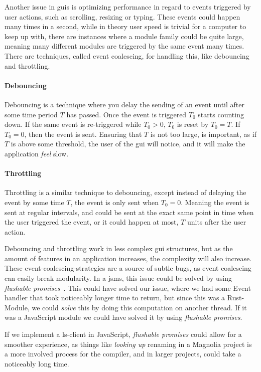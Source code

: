 Another issue in \gls*{gui}s is optimizing performance in regard to events
triggered by user actions, such as scrolling, resizing or typing. These events
could happen many times in a second, while in theory user speed is trivial for a
computer to keep up with, there are instances where a module family could be
quite large, meaning many different modules are triggered by the same event many
times. There are techniques, called event coalescing, for handling this, like
debouncing and throttling.

\paragraph{Debouncing} Debouncing is a technique where you delay the sending of
an event until after some time period $T$ has passed. Once the event is triggered
$T_0$ starts counting down. If the same event is re-triggered while $T_0 > 0$,
$T_0$ is reset by $T_0 = T$. If $T_0 = 0$, then the event is sent. Ensuring that
$T$ is not too large, is important, as if $T$ is above some threshold, the user
of the \gls*{gui} will notice, and it will make the application \textit{feel}
slow.

\paragraph{Throttling} Throttling is a similar technique to debouncing, except
instead of delaying the event by some time $T$, the event is only sent when
$T_0 = 0$. Meaning the event is sent at regular intervals, and could be sent at
the exact same point in time when the user triggered the event, or it could
happen at most, $T$ units after the user action.

Debouncing and throttling work in less complex \gls*{gui} structures, but as the
amount of features in an application increases, the complexity will also
increase. These event-coalescing-strategies are a source of subtle bugs, as
event coalescing can easily break modularity. In a \gls*{jsms}, this issue could
be solved by using \textit{flushable promises}~\cite{flush}. This could have
solved our issue, where we had some Event handler that took noticeably longer
time to return, but since this was a Rust-Module, we could \textit{solve} this
by doing this computation on another thread. If it was a JavaScript module we
could have solved it by using \textit{flushable promises}.

If we implement a \gls*{ls}-client in JavaScript, \textit{flushable promises}
could allow for a smoother experience, as things like \textit{looking up}
renaming in a Magnolia project is a more involved process for the compiler,
and in larger projects, could take a noticeably long time.



